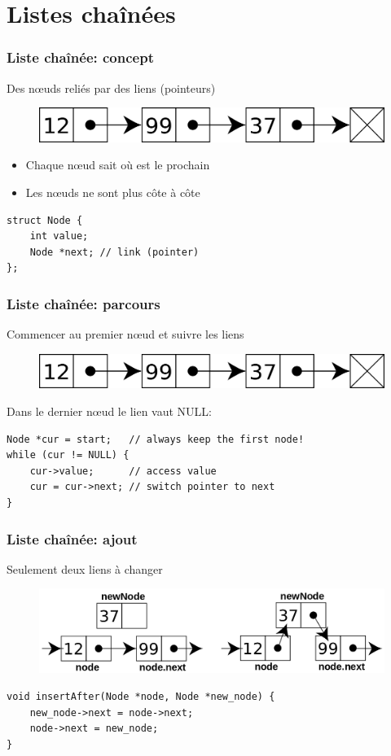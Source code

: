 \documentclass[12pt]{beamer}
\begin{document}
\section{Listes chaînées}

\begin{frame}[fragile]
\frametitle{Liste chaînée: concept}
Des nœuds reliés par des liens (pointeurs)
\begin{figure}
\centering
\includegraphics[width=.8\textwidth]{img/singly-linked}
\end{figure}
\begin{itemize}
\item Chaque nœud sait où est le prochain
\item Les nœuds ne sont plus côte à côte
\end{itemize}
\begin{lstlisting}
struct Node {
    int value;
    Node *next; // link (pointer)
};
\end{lstlisting}
\end{frame}

\begin{frame}[fragile]
\frametitle{Liste chaînée: parcours}
Commencer au premier nœud et suivre les liens
\begin{figure}
\centering
\includegraphics[width=.6\textwidth]{img/singly-linked}
\end{figure}
Dans le dernier nœud le lien vaut NULL:
\begin{lstlisting}
Node *cur = start;   // always keep the first node!
while (cur != NULL) {
    cur->value;      // access value
    cur = cur->next; // switch pointer to next
}
\end{lstlisting}
\end{frame}

\begin{frame}[fragile]
\frametitle{Liste chaînée: ajout}
Seulement deux liens à changer
\begin{figure}
\centering
\includegraphics[width=.9\textwidth]{img/insert-node}
\end{figure}
\begin{lstlisting}
void insertAfter(Node *node, Node *new_node) {
    new_node->next = node->next;
    node->next = new_node;
}
\end{lstlisting}
\end{frame}
\end{document}
